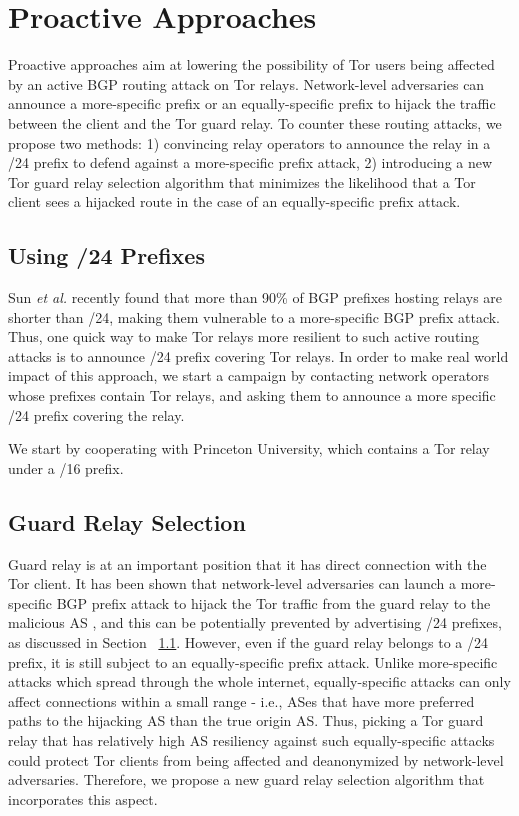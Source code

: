 \section{Proactive Approaches}
Proactive approaches aim at lowering the possibility of Tor users being affected by an active BGP routing attack on Tor relays. Network-level adversaries can announce a more-specific prefix or an equally-specific prefix to hijack the traffic between the client and the Tor guard relay. To counter these routing attacks, we propose two methods: 1) convincing relay operators to announce the relay in a /24 prefix to defend against a more-specific prefix attack, 2) introducing a new Tor guard relay selection algorithm that minimizes the likelihood that a Tor client sees a hijacked route in the case of an equally-specific prefix attack.

\subsection{Using /24 Prefixes}
\label{subsec:24prefix}

Sun \emph{et al.} \cite{sun2015raptor} recently found that more than 90\% of BGP prefixes hosting relays are
shorter than /24, making them vulnerable to a more-specific BGP prefix attack. Thus, one quick way to make Tor relays more resilient to such active routing attacks is to announce /24 prefix covering Tor relays. In order to make real world impact of this approach, we start a campaign by contacting network operators whose prefixes contain Tor relays, and asking them to announce a more specific /24 prefix covering the relay. 

We start by cooperating with Princeton University, which contains a Tor relay under a /16 prefix. 

\subsection{Guard Relay Selection}

Guard relay is at an important position that it has direct connection with the Tor client. It has been shown that network-level adversaries can launch a more-specific BGP prefix attack to hijack the Tor traffic from the guard relay to the malicious AS \cite{sun2015raptor}, and this can be potentially prevented by advertising /24 prefixes, as discussed in Section ~\ref{subsec:24prefix}. However, even if the guard relay belongs to a /24 prefix, it is still subject to an equally-specific prefix attack. Unlike more-specific attacks which spread through the whole internet, equally-specific attacks can only affect connections within a small range - i.e., ASes that have more preferred paths to the hijacking AS than the true origin AS. Thus, picking a Tor guard relay that has relatively high AS resiliency against such equally-specific attacks could protect Tor clients from being affected and deanonymized by network-level adversaries. Therefore, we propose a new guard relay selection algorithm that incorporates this aspect.

